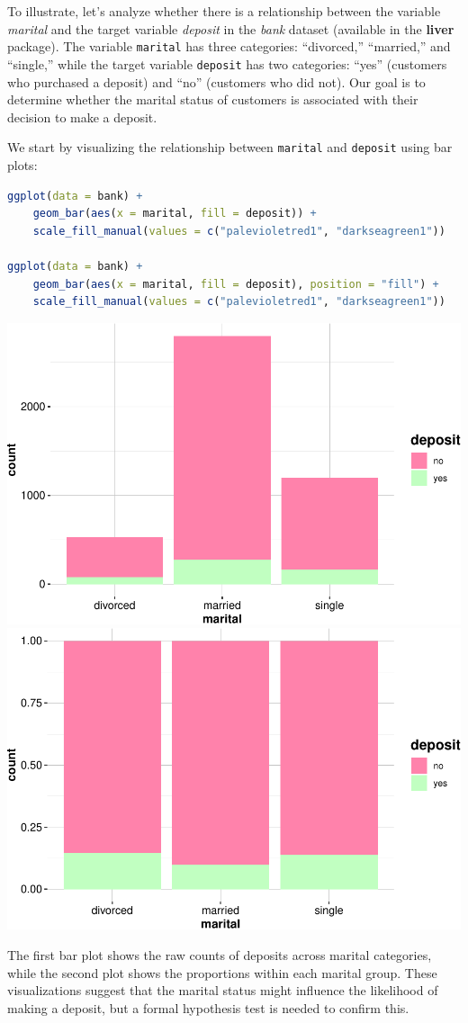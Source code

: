 \documentclass[
]{book}
\newcommand{\passthrough}[1]{#1}
\theoremstyle{definition}
\theoremstyle{definition}
\theoremstyle{definition}
\theoremstyle{definition}
\theoremstyle{remark}
\begin{document}
To illustrate, let's analyze whether there is a relationship between the variable \emph{marital} and the target variable \emph{deposit} in the \emph{bank} dataset (available in the \textbf{liver} package). The variable \passthrough{\lstinline!marital!} has three categories: ``divorced,'' ``married,'' and ``single,'' while the target variable \passthrough{\lstinline!deposit!} has two categories: ``yes'' (customers who purchased a deposit) and ``no'' (customers who did not). Our goal is to determine whether the marital status of customers is associated with their decision to make a deposit.

We start by visualizing the relationship between \passthrough{\lstinline!marital!} and \passthrough{\lstinline!deposit!} using bar plots:

\begin{lstlisting}[language=R]
ggplot(data = bank) + 
    geom_bar(aes(x = marital, fill = deposit)) +
    scale_fill_manual(values = c("palevioletred1", "darkseagreen1")) 

ggplot(data = bank) + 
    geom_bar(aes(x = marital, fill = deposit), position = "fill") +
    scale_fill_manual(values = c("palevioletred1", "darkseagreen1")) 
\end{lstlisting}

\includegraphics[width=0.5\linewidth]{statistics_files/figure-latex/unnamed-chunk-14-1} \includegraphics[width=0.5\linewidth]{statistics_files/figure-latex/unnamed-chunk-14-2}

The first bar plot shows the raw counts of deposits across marital categories, while the second plot shows the proportions within each marital group. These visualizations suggest that the marital status might influence the likelihood of making a deposit, but a formal hypothesis test is needed to confirm this.
\end{document}
